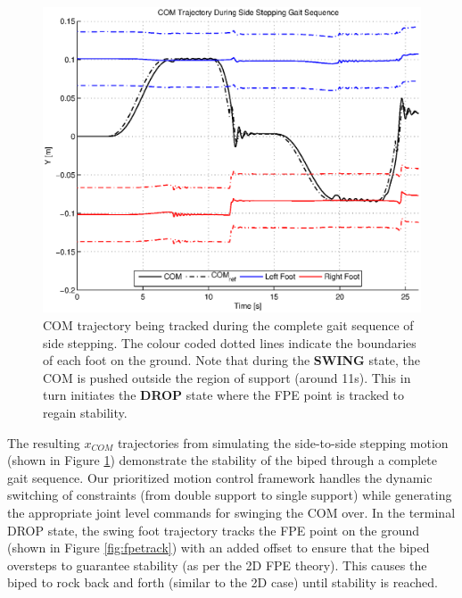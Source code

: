 \begin{figure}[!h]
	\centering
    \includegraphics[scale=0.5]{fig/ch4/comtraj.eps}
  	\caption{COM trajectory being tracked during the complete gait sequence of side stepping. The colour coded dotted lines indicate the boundaries of each foot on the ground. Note that during the \textbf{SWING} state, the COM is pushed outside the region of support (around 11s). This in turn initiates the \textbf{DROP} state where the FPE point is tracked to regain stability.}
	\label{fig:comtraj}
\end{figure}

The resulting $x_{COM}$ trajectories from simulating the side-to-side stepping motion (shown in Figure \ref{fig:comtraj}) demonstrate the stability of the biped through a complete gait sequence. Our prioritized motion control framework handles the dynamic switching of constraints (from double support to single support) while generating the appropriate joint level commands for swinging the COM over. In the terminal DROP state, the swing foot trajectory tracks the FPE point on the ground (shown in Figure \ref{fig:fpetrack}) with an added offset to ensure that the biped oversteps to guarantee stability (as per the 2D FPE theory). This causes the biped to rock back and forth (similar to the 2D case) until stability is reached.


